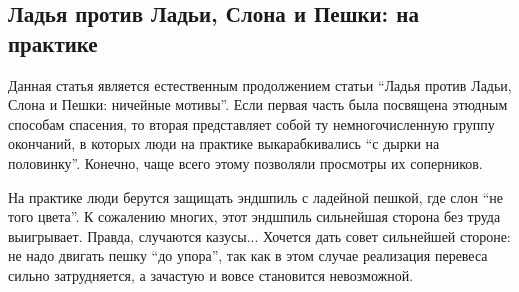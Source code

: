 \subsection*{Ладья против Ладьи, Слона и Пешки: на практике}
\markright{}

Данная статья является естественным продолжением статьи ``Ладья против Ладьи, Слона и Пешки: ничейные мотивы''. Если первая часть была посвящена этюдным способам спасения, то вторая представляет собой ту немногочисленную группу окончаний, в которых люди на практике выкарабкивались ``с дырки на половинку''. Конечно, чаще всего этому позволяли просмотры их соперников.

На практике люди берутся защищать эндшпиль с ладейной пешкой, где слон ``не того цвета''. К сожалению многих, этот эндшпиль сильнейшая сторона без труда выигрывает. Правда, случаются казусы... Хочется дать совет сильнейшей стороне: не надо двигать пешку ``до упора'', так как в этом случае реализация перевеса сильно затрудняется, а зачастую и вовсе становится невозможной.

